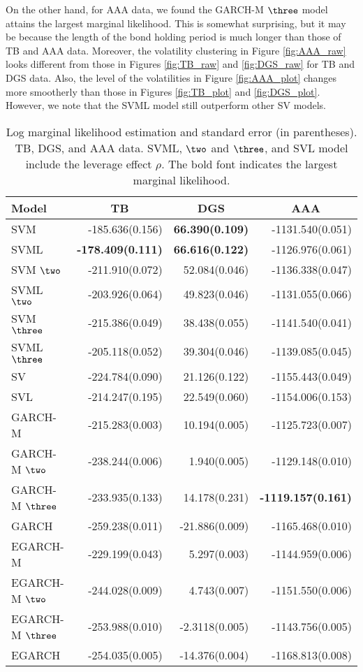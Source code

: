 On the other hand, for AAA data, we found the GARCH-M $\three$ model attains the largest marginal likelihood. This is somewhat surprising, but it may be because the length of the bond holding period is much longer than those of TB and AAA data. Moreover, the volatility clustering in Figure   \ref{fig:AAA_raw} looks different from those in Figures  \ref{fig:TB_raw} and \ref{fig:DGS_raw} for TB and DGS data.
Also, the level of the volatilities in Figure \ref{fig:AAA_plot} changes more smootherly than those in Figures \ref{fig:TB_plot} and \ref{fig:DGS_plot}. However, we note that the SVML model still outperform other SV models.
\begin{table}[H]
    \small
  \centering
  \begin{tabular}{lrrr}
    \hline 
    Model & \multicolumn{1}{c}{TB} &\multicolumn{1}{c}{DGS} & \multicolumn{1}{c}{AAA} \\
    \hline
    SVM & -185.636(0.156) & \textbf{66.390(0.109)} & -1131.540(0.051) \\
    SVML & \bf{-178.409(0.111)} & \bf{66.616(0.122)} & -1126.976(0.061)\vspace{2mm}\\
    SVM $\two$ & -211.910(0.072) & 52.084(0.046) & -1136.338(0.047) \\
    SVML $\two$ & -203.926(0.064) & 49.823(0.046) & -1131.055(0.066) \\
    SVM $\three$ & -215.386(0.049) & 38.438(0.055) & -1141.540(0.041) \\
    SVML $\three$ & -205.118(0.052) & 39.304(0.046) & -1139.085(0.045)\\     SV & -224.784(0.090) & 21.126(0.122) & -1155.443(0.049) \\
    SVL & -214.247(0.195) & 22.549(0.060) & -1154.006(0.153)\vspace{2mm}\\  
    GARCH-M & -215.283(0.003) & 10.194(0.005) & -1125.723(0.007) \\
    GARCH-M $\two$ & -238.244(0.006) & 1.940(0.005) & -1129.148(0.010) \\
    GARCH-M $\three$ & -233.935(0.133) & 14.178(0.231) & \bf{-1119.157(0.161)} \\
    GARCH & -259.238(0.011) & -21.886(0.009) & -1165.468(0.010)\vspace{2mm}\\  
    EGARCH-M & -229.199(0.043) & 5.297(0.003) & -1144.959(0.006) \\
    EGARCH-M $\two$ & -244.028(0.009) & 4.743(0.007) & -1151.550(0.006) \\
    EGARCH-M $\three$ & -253.988(0.010) & -2.3118(0.005) & -1143.756(0.005) \\
    EGARCH & -254.035(0.005) & -14.376(0.004) & -1168.813(0.008) \\
    \hline
  \end{tabular}
  \caption{Log marginal likelihood estimation and standard error (in parentheses). TB, DGS, and AAA data. SVML, $\two$ and $\three$, and SVL model include the leverage effect $\rho$. The bold font indicates the largest marginal likelihood.}
  \label{table:log_marginal_app}
  \normalsize
\end{table}
